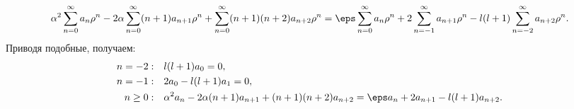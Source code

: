 \[
	\alpha^2 \sum_{n=0}^{\infty} a_n\rho^n -
	2\alpha\sum_{n=0}^{\infty} (n+1)a_{n+1}\rho^n +
	\sum_{n=0}^{\infty} (n+1)(n+2)a_{n+2}\rho^n =
	\eps\sum_{n=0}^{\infty} a_n\rho^n +
	2\sum_{n=-1}^{\infty} a_{n+1}\rho^n -
	l(l+1)\sum_{n=-2}^{\infty} a_{n+2}\rho^n.
\]
Приводя подобные, получаем:
\begin{align*}
	n=-2:&\quad l(l+1)a_0 = 0,\\
	n=-1:&\quad 2a_0 - l(l+1)a_1 = 0,\\
	n\ge0:&\quad \alpha^2 a_n - 2\alpha(n+1)a_{n+1}+
	(n+1)(n+2)a_{n+2} = \eps a_n +
	2 a_{n+1} - l(l+1)a_{n+2}.
\end{align*}